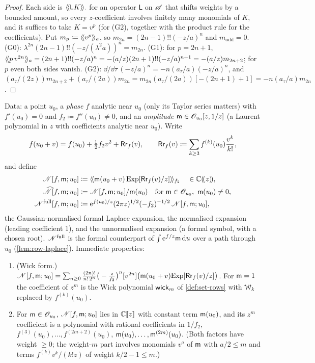 \begin{proof}
Each side is $\langle\!\langle \mathsf{L}K\rangle\!\rangle_{\cdot}$ for an operator $\mathsf{L}$ on $\mathscr{A}$ that shifts weights by a bounded amount, so every $z$-coefficient involves finitely many monomials of $K$, and it suffices to take $K=v^p$ (for (G2), together with the product rule for the coefficients). Put $m_p\coloneqq\langle\!\langle v^p\rangle\!\rangle_{a}$, so $m_{2n}=(2n-1)!!(-z/a)^n$ and $m_{\mathrm{odd}}=0$. (G0): $\lambda^{2n}(2n-1)!!(-z/(\lambda^2a))^n=m_{2n}$. (G1): for $p=2n+1$, $\langle\!\langle p\,v^{2n}\rangle\!\rangle_{a}=(2n+1)!!(-z/a)^n=-(a/z)(2n+1)!!(-z/a)^{n+1}=-(a/z)m_{2n+2}$; for $p$ even both sides vanish. (G2): $\dd/\dd\tau\,(-z/a)^n=-n(a_\tau/a)(-z/a)^n$, and $(a_\tau/(2z))m_{2n+2}+(a_\tau/(2a))m_{2n}=m_{2n}(a_\tau/(2a))[-(2n+1)+1]=-n(a_\tau/a)m_{2n}$.
\end{proof}

\begin{defn}
\label{def:row-Lnorm}
Data: a point $u_0$, a \emph{phase} $f$ analytic near $u_0$ (only its Taylor series matters) with $f'(u_0)=0$ and $f_2\coloneqq f''(u_0)\neq0$, and an \emph{amplitude} $\mathsf{m}\in\mathscr{O}_{u_0}[z,1/z]$ (a Laurent polynomial in $z$ with coefficients analytic near $u_0$). Write
\[
f(u_0+v)=f(u_0)+\tfrac12f_2v^2+\mathsf{Rr}_f(v),\qquad \mathsf{Rr}_f(v)\coloneqq\sum_{k\geq3}f^{(k)}(u_0)\frac{v^k}{k!},
\]
and define
\begin{align*}
\mathscr{N}[f,\mathsf{m};u_0]&\coloneqq\langle\!\langle \mathsf{m}(u_0+v)\,\mathrm{Exp}[\mathsf{Rr}_f(v)/z]\rangle\!\rangle_{f_2}\quad\in\mathbb{C}(\!(z)\!),\\
\widehat{\mathscr{N}}[f,\mathsf{m};u_0]&\coloneqq\mathscr{N}[f,\mathsf{m};u_0]/\mathsf{m}(u_0)\quad\text{for }\mathsf{m}\in\mathscr{O}_{u_0},\ \mathsf{m}(u_0)\neq0,\\
\mathscr{N}^{\mathrm{full}}[f,\mathsf{m};u_0]&\coloneqq\mathrm{e}^{f(u_0)/z}(2\pi z)^{1/2}(-f_2)^{-1/2}\,\mathscr{N}[f,\mathsf{m};u_0],
\end{align*}
the Gaussian-normalised formal Laplace expansion, the normalised expansion (leading coefficient $1$), and the unnormalised expansion (a formal symbol, with a chosen root). $\mathscr{N}^{\mathrm{full}}$ is the formal counterpart of $\int\mathrm{e}^{f/z}\mathsf{m}\,\mathrm{d} u$ over a path through $u_0$ (\cref{lem:row-laplace}). Immediate properties:
\begin{enumerate}
\item[(D1)] (Wick form.) $\mathscr{N}[f,\mathsf{m};u_0]=\sum_{n\geq0}\frac{(2n)!}{n!\,2^n}\big(-\frac{z}{f_2}\big)^n[v^{2n}]\big(\mathsf{m}(u_0+v)\mathrm{Exp}[\mathsf{Rr}_f(v)/z]\big)$. For $\mathsf{m}=1$ the coefficient of $z^m$ is the Wick polynomial $\mathsf{wick}_m$ of \cref{def:set-rows} with $\mathcal{W}_k$ replaced by $f^{(k)}(u_0)$.
\item[(D2)] For $\mathsf{m}\in\mathscr{O}_{u_0}$, $\mathscr{N}[f,\mathsf{m};u_0]$ lies in $\mathbb{C}[\![ z ]\!]$ with constant term $\mathsf{m}(u_0)$, and its $z^m$ coefficient is a polynomial with rational coefficients in $1/f_2$, $f^{(3)}(u_0),\dots,f^{(2m+2)}(u_0)$, $\mathsf{m}(u_0),\dots,\mathsf{m}^{(2m)}(u_0)$. (Both factors have weight $\geq0$; the weight-$m$ part involves monomials $v^a$ of $\mathsf{m}$ with $a/2\leq m$ and terms $f^{(k)}v^k/(k!z)$ of weight $k/2-1\leq m$.)

\end{enumerate}
\end{defn}
